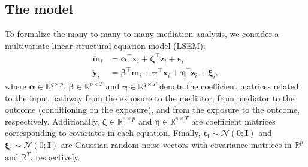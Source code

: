 \documentclass[
  12pt]{article}
\def\R{\mathbb{R}}
\def\M{\mathbf{m}}
\def\X{\mathbf{x}}
\def\Y{\mathbf{y}}
\def\Z{\mathbf{z}}
\begin{document}
\subsection{The model}
\vspace{-.5em}

To formalize the many-to-many-to-many mediation analysis, we consider a multivariate linear structural equation model (LSEM):
\begin{align}
	\ddot{\mathbf{m}}_{i}  &=   \bm{\alpha}^{\top} \mathbf{x}_{i}
    +
       \bm{\zeta}^{\top} \mathbf{z}_{i}
    +
    \bm{\epsilon}_{i}\label{equa:MMAMA.model:selected.genes:equa1} \\
	\ddot{\mathbf{y}}_{i}
    &=    \bm{\beta}^{\top} \mathbf{m}_{i}
    +
        \bm{\gamma}^{\top}\mathbf{x}_{i}
    +
      \bm{\eta}^{\top} \mathbf{z}_{i} +    
     \bm{\xi}_{i},  	\label{equa:MMAMA.model:selected.genes:equa2}
\end{align}
where $\bm{\alpha} \in \R^{q \times p}$,  $\bm{\beta} \in \R^{p \times T}$ and $\bm{\gamma} \in \R^{q  \times T}$ denote the coefficient matrices related to the input pathway from the exposure to the mediator, from mediator to the outcome (conditioning on the exposure), and from the exposure to the outcome, respectively. Additionally,
$\bm{\zeta} \in \R^{s \times p}$ and $\bm{\eta} \in \R^{s \times T}$ are coefficient matrices corresponding to covariates in each equation.
Finally, $\bm{\epsilon_{i}}{\sim} \mathcal{N} \left( 0 ; \mathbf{I}\right)$
and %
$\bm{\xi_{i}}{\sim} \mathcal{N} \left( 0 ; \mathbf{I} \right)$ are Gaussian random noise vectors with covariance matrices in $\mathbb{R}^p$ and $\mathbb{R}^T$, respectively.

\end{document}
